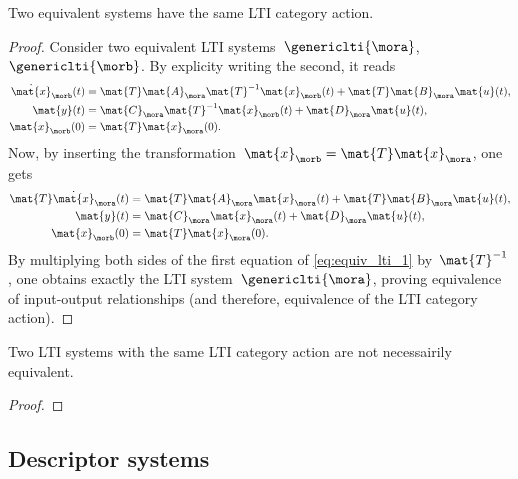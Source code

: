 \begin{lemma}
    Two equivalent systems have the same LTI category action.
\end{lemma}
\begin{proof}
    Consider two equivalent LTI systems~$\genericlti{\mora}$,~$\genericlti{\morb}$.
    By explicity writing the second, it reads
    \begin{equation*}
        \begin{aligned}
            \dot{\mat{x}}_\morb(t) & =\mat{T}\mat{A}_{\mora}\mat{T}^{-1}\mat{x}_\morb(t)+\mat{T}\mat{B}_{\mora}\mat{u}(t), \\
            \mat{y}(t)             & =\mat{C}_{\mora}\mat{T}^{-1}\mat{x}_\morb(t)+\mat{D}_{\mora}\mat{u}(t), \\
            \mat{x}_\morb(0)       & =\mat{T}\mat{x}_{\mora}(0).
        \end{aligned}
    \end{equation*}
    Now, by inserting the transformation~$\mat{x}_\morb=\mat{T}\mat{x}_\mora$, one gets
    \begin{equation}
        \label{eq:equiv_lti_1}
        \begin{aligned}
            \mat{T}\dot{\mat{x}}_\mora(t) & =\mat{T}\mat{A}_{\mora}\mat{x}_\mora(t)+\mat{T}\mat{B}_{\mora}\mat{u}(t), \\
            \mat{y}(t)                    & =\mat{C}_{\mora}\mat{x}_\mora(t)+\mat{D}_{\mora}\mat{u}(t), \\
            \mat{x}_\morb(0)              & =\mat{T}\mat{x}_{\mora}(0).
        \end{aligned}
    \end{equation}
    By multiplying both sides of the first equation of \cref{eq:equiv_lti_1} by~$\mat{T}^{-1}$, one obtains exactly the LTI system~$\genericlti{\mora}$, proving equivalence of input-output relationships (and therefore, equivalence of the LTI category action).
\end{proof}

\begin{lemma}
    Two LTI systems with the same LTI category action are not necessairily equivalent.
\end{lemma}
\begin{proof}
\end{proof}

\subsection{Descriptor systems}

